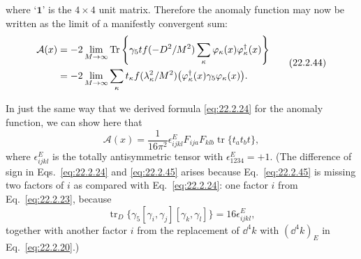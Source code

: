 where `$\mathbf{1}$' is the $4\times4$ unit matrix. Therefore the anomaly
function may now be written as the limit of a manifestly convergent sum:
\begin{equation}
 \begin{aligned}
 \mathcal A(x)
 &=-2\lim_{M\to\infty}\operatorname{Tr}
 \left\{\gamma_5t f(-\sl{D}^2/M^2)
 \sum_\kappa\varphi_\kappa(x)\varphi_\kappa^\dagger(x)\right\}\\
 &=-2\lim_{M\to\infty}\sum_\kappa
 t_\kappa f(\lambda_\kappa^2/M^2)
 \bigl(\varphi_\kappa^\dagger(x)\gamma_5\varphi_\kappa(x)\bigr).
 \end{aligned}
 \tag{22.2.44}\label{eq:22.2.44}
\end{equation}

In just the same way that we derived formula \eqref{eq:22.2.24} for the
anomaly function, we can show here that
\begin{equation}
 \mathcal A(x)=\frac{1}{16\pi^2}\epsilon^E_{ijkl}
 F_{ija}F_{klb}\operatorname{tr}\{t_a t_b t\},
 \tag{22.2.45}\label{eq:22.2.45}
\end{equation}
where $\epsilon^E_{ijkl}$ is the totally antisymmetric tensor with
$\epsilon^E_{1234}=+1$. (The difference of sign in
Eqs.~\eqref{eq:22.2.24} and \eqref{eq:22.2.45} arises because
Eq.~\eqref{eq:22.2.45} is missing two factors of $i$ as compared with
Eq.~\eqref{eq:22.2.24}: one factor $i$ from Eq.~\eqref{eq:22.2.23},
because
\[
 \operatorname{tr}_{D}\{\gamma_5
 [\gamma_i,\gamma_j][\gamma_k,\gamma_l]\}
 =16\epsilon^E_{ijkl},
\]
together with another factor $i$ from the replacement of $\dd^4k$ with
$(\dd^4k)_E$ in Eq.~\eqref{eq:22.2.20}.)

